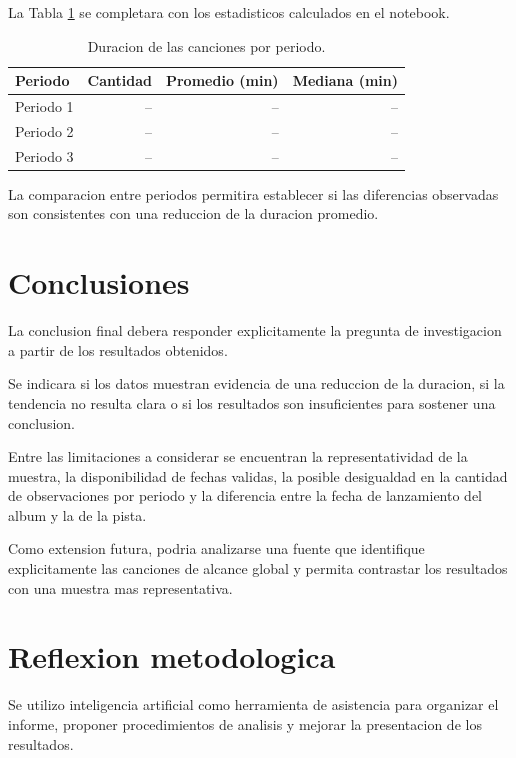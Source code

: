 \documentclass[11pt,a4paper]{article}
\begin{document}
La Tabla \ref{tab:resumen} se completara con los
estadisticos calculados en el notebook.

\begin{table}[H]
    \centering
    \caption{Duracion de las canciones por periodo.}
    \label{tab:resumen}
    \begin{tabular}{lrrr}
        \toprule
        Periodo & Cantidad & Promedio (min) & Mediana (min) \\
        \midrule
        Periodo 1 & -- & -- & -- \\
        Periodo 2 & -- & -- & -- \\
        Periodo 3 & -- & -- & -- \\
        \bottomrule
    \end{tabular}
\end{table}

La comparacion entre periodos permitira establecer si
las diferencias observadas son consistentes con una
reduccion de la duracion promedio.

\section{Conclusiones}

La conclusion final debera responder explicitamente
la pregunta de investigacion a partir de los resultados
obtenidos.

Se indicara si los datos muestran evidencia de una
reduccion de la duracion, si la tendencia no resulta
clara o si los resultados son insuficientes para sostener
una conclusion.

Entre las limitaciones a considerar se encuentran la
representatividad de la muestra, la disponibilidad de
fechas validas, la posible desigualdad en la cantidad
de observaciones por periodo y la diferencia entre la
fecha de lanzamiento del album y la de la pista.

Como extension futura, podria analizarse una fuente
que identifique explicitamente las canciones de alcance
global y permita contrastar los resultados con una
muestra mas representativa.

\section{Reflexion metodologica}

Se utilizo inteligencia artificial como herramienta
de asistencia para organizar el informe, proponer
procedimientos de analisis y mejorar la presentacion
de los resultados.
\end{document}
